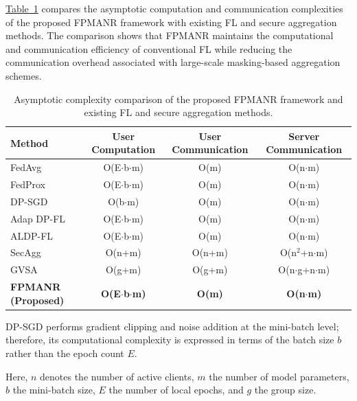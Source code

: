 \documentclass[a4paper,fleqn]{cas-dc}
\newcommand{\xtab}[1]{\hyperref[#1]{Table~\ref*{#1}}}
\begin{document}
\xtab{tab:4} compares the asymptotic computation and communication complexities of the proposed FPMANR framework with existing FL and secure aggregation methods. The comparison shows that FPMANR maintains the computational and communication efficiency of conventional FL while reducing the communication overhead associated with large-scale masking-based aggregation schemes.

\begin{table}
\centering
\footnotesize
\caption{Asymptotic complexity comparison of the proposed FPMANR framework and existing FL and secure aggregation methods.}
\label{tab:4}
\begin{tabular}{l c c c}
\toprule
\textbf{Method} & \textbf{User Computation} & \textbf{User Communication} & \textbf{Server Communication} \\
\midrule
FedAvg \citep{mcmahan2017communication} & O(E$\cdot$b$\cdot$m) & O(m) & O(n$\cdot$m) \\
FedProx \citep{li2020federated} & O(E$\cdot$b$\cdot$m) & O(m) & O(n$\cdot$m) \\
DP-SGD \citep{fernandez2025differential} & O(b$\cdot$m)\dag{} & O(m) & O(n$\cdot$m) \\
Adap DP-FL \citep{fu2022adap} & O(E$\cdot$b$\cdot$m) & O(m) & O(n$\cdot$m) \\
ALDP-FL \citep{cui2025aldp} & O(E$\cdot$b$\cdot$m) & O(m) & O(n$\cdot$m) \\
SecAgg \citep{bonawitz2017practical} & O(n+m) & O(n+m) & O(n$^{2}$+n$\cdot$m) \\
GVSA \citep{zhou2025group} & O(g+m) & O(g+m) & O(n$\cdot$g+n$\cdot$m) \\
\textbf{FPMANR (Proposed)} & \textbf{O(E$\cdot$b$\cdot$m)} & \textbf{O(m)} & \textbf{O(n$\cdot$m)} \\
\bottomrule
\end{tabular}
\par\vspace{2pt}\begin{minipage}{\textwidth}\footnotesize
\dag{} DP-SGD performs gradient clipping and noise addition at the mini-batch level; therefore, its computational complexity is expressed in terms of the batch size $b$ rather than the epoch count $E$.

Here, $n$ denotes the number of active clients, $m$ the number of model parameters, $b$ the mini-batch size, $E$ the number of local epochs, and $g$ the group size.
\end{minipage}
\end{table}
\end{document}
